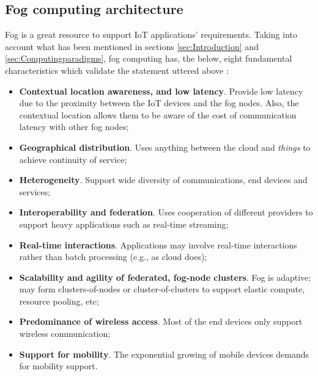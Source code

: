\subsection{Fog computing architecture}
Fog is a great resource to support IoT applications' requirements. Taking into account what has been mentioned in sections \ref{sec:Introduction} and \ref{sec:Computingparadigms}, fog computing has, the below, eight fundamental characteristics which validate the 
statement uttered above \cite{iorga2018fog}:
\begin{itemize}
	\item \textbf{Contextual location awareness, and low latency}. Provide low latency due to the proximity between the IoT devices and the fog nodes. Also, the contextual location allows them to be aware of the cost of communication latency with other fog nodes;
	\item \textbf{Geographical distribution}. Uses anything between the cloud and \textit{things} to achieve continuity of service;
	\item \textbf{Heterogeneity}. Support wide diversity of communications, end devices and services;
	\item \textbf{Interoperability and federation}. Uses cooperation of different providers to support heavy applications such as real-time streaming;
	\item \textbf{Real-time interactions}. Applications may involve real-time interactions rather than batch processing (e.g., as cloud does);
	\item \textbf{Scalability and agility of federated, fog-node clusters}. Fog is adaptive; may form clusters-of-nodes or cluster-of-clusters to support elastic compute, resource pooling, etc;
	\item \textbf{Predominance of wireless access}. Most of the end devices only support wireless communication;
	\item \textbf{Support for mobility}. The exponential growing of mobile devices demands for mobility support.
\end{itemize}

